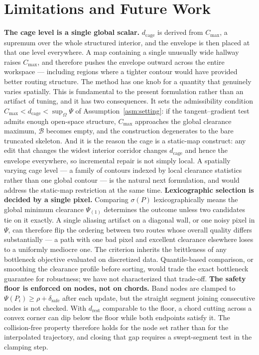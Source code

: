 \documentclass[conference]{IEEEtran}
\begin{document}
\section{Limitations and Future Work}
\label{sec:limitations}
\textbf{The cage level is a single global scalar.} $d_{\mathrm{cage}}$ is derived from $C_{\max}$, a supremum over the whole structured interior, and the envelope is then placed at that one level everywhere. A map containing a single unusually wide hallway raises $C_{\max}$, and therefore pushes the envelope outward across the entire workspace --- including regions where a tighter contour would have provided better routing structure. The method has one knob for a quantity that genuinely varies spatially. This is fundamental to the present formulation rather than an artifact of tuning, and it has two consequences. It sets the admissibility condition $C_{\max}<d_{\mathrm{cage}}<\sup_\Omega\Psi$ of Assumption~\ref{asm:setting}: if the tangent--gradient test admits enough open-space structure, $C_{\max}$ approaches the global clearance maximum, $\mathcal{B}$ becomes empty, and the construction degenerates to the bare truncated skeleton. And it is the reason the cage is a static-map construct: any edit that changes the widest interior corridor changes $d_{\mathrm{cage}}$ and hence the envelope everywhere, so incremental repair is not simply local. A spatially varying cage level --- a family of contours indexed by local clearance statistics rather than one global contour --- is the natural next formulation, and would address the static-map restriction at the same time.
\textbf{Lexicographic selection is decided by a single pixel.} Comparing $\sigma(P)$ lexicographically means the global minimum clearance $\Psi_{(1)}$ determines the outcome unless two candidates tie on it exactly. A single aliasing artifact on a diagonal wall, or one noisy pixel in $\Psi$, can therefore flip the ordering between two routes whose overall quality differs substantially --- a path with one bad pixel and excellent clearance elsewhere loses to a uniformly mediocre one. The criterion inherits the brittleness of any bottleneck objective evaluated on discretized data. Quantile-based comparison, or smoothing the clearance profile before sorting, would trade the exact bottleneck guarantee for robustness; we have not characterized that trade-off.
\textbf{The safety floor is enforced on nodes, not on chords.} Band nodes are clamped to $\Psi(P_i)\ge\rho+\delta_{\mathrm{safe}}$ after each update, but the straight segment joining consecutive nodes is not checked. With $d_{\mathrm{rest}}$ comparable to the floor, a chord cutting across a convex corner can dip below the floor while both endpoints satisfy it. The collision-free property therefore holds for the node set rather than for the interpolated trajectory, and closing that gap requires a swept-segment test in the clamping step.
\end{document}
